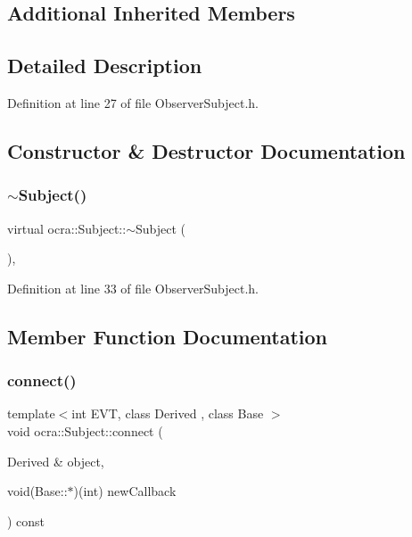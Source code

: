 \subsection*{Additional Inherited Members}


\subsection{Detailed Description}


Definition at line 27 of file Observer\+Subject.\+h.



\subsection{Constructor \& Destructor Documentation}
\hypertarget{classocra_1_1Subject_a4189b52b5d0a5b53d43e7a0f97a02fd7}{}\label{classocra_1_1Subject_a4189b52b5d0a5b53d43e7a0f97a02fd7} 
\subsubsection{\texorpdfstring{$\sim$\+Subject()}{~Subject()}}
{\footnotesize\ttfamily virtual ocra\+::\+Subject\+::$\sim$\+Subject (\begin{DoxyParamCaption}{ }\end{DoxyParamCaption})\hspace{0.3cm}{\ttfamily [inline]}, {\ttfamily [virtual]}}



Definition at line 33 of file Observer\+Subject.\+h.



\subsection{Member Function Documentation}
\hypertarget{classocra_1_1Subject_ab12f4d7cbe86db1cd707bd94ba86b682}{}\label{classocra_1_1Subject_ab12f4d7cbe86db1cd707bd94ba86b682} 
\subsubsection{\texorpdfstring{connect()}{connect()}\hspace{0.1cm}{\footnotesize\ttfamily [1/2]}}
{\footnotesize\ttfamily template$<$int E\+VT, class Derived , class Base $>$ \\
void ocra\+::\+Subject\+::connect (\begin{DoxyParamCaption}\item[{Derived \&}]{object,  }\item[{void(Base\+::$\ast$)(int)}]{new\+Callback }\end{DoxyParamCaption}) const\hspace{0.3cm}{\ttfamily [inline]}}



